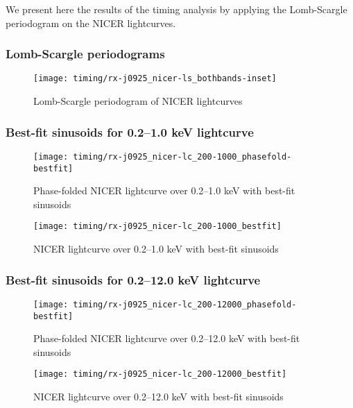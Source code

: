 			We present here the results of the timing analysis by applying the Lomb-Scargle periodogram on the NICER lightcurves.
			
			\subsubsection{Lomb-Scargle periodograms}
				\begin{figure}[h!]
					\centering
					\texttt{[image: timing/rx-j0925\_nicer-ls\_bothbands-inset]}
					\caption{Lomb-Scargle periodogram of NICER lightcurves}
					\label{result:ls-mrvel-nicer}
				\end{figure}
			
			\subsubsection{Best-fit sinusoids for 0.2--1.0 keV lightcurve}
				\begin{figure}[h!]
					\centering
					\texttt{[image: timing/rx-j0925\_nicer-lc\_200-1000\_phasefold-bestfit]}
					\caption{Phase-folded NICER lightcurve over 0.2--1.0 keV with best-fit sinusoids}
					\label{result:lc-phase-fold-mrvel-nicer:200-1000-bestfit}
				\end{figure}
				
				\begin{figure}[h!]
					\centering
					\texttt{[image: timing/rx-j0925\_nicer-lc\_200-1000\_bestfit]}
					\caption{NICER lightcurve over 0.2--1.0 keV with best-fit sinusoids}
					\label{result:lc-mrvel-nicer:200-1000-bestfit}
				\end{figure}
				
			\subsubsection{Best-fit sinusoids for 0.2--12.0 keV lightcurve}
				\begin{figure}[h!]
					\centering
					\texttt{[image: timing/rx-j0925\_nicer-lc\_200-12000\_phasefold-bestfit]}
					\caption{Phase-folded NICER lightcurve over 0.2--12.0 keV with best-fit sinusoids}
					\label{result:lc-phase-fold-mrvel-nicer:200-12000-bestfit}
				\end{figure}
				
				\begin{figure}[h!]
					\centering
					\texttt{[image: timing/rx-j0925\_nicer-lc\_200-12000\_bestfit]}
					\caption{NICER lightcurve over 0.2--12.0 keV with best-fit sinusoids}
					\label{result:lc-mrvel-nicer:200-12000-bestfit}
				\end{figure}
				
